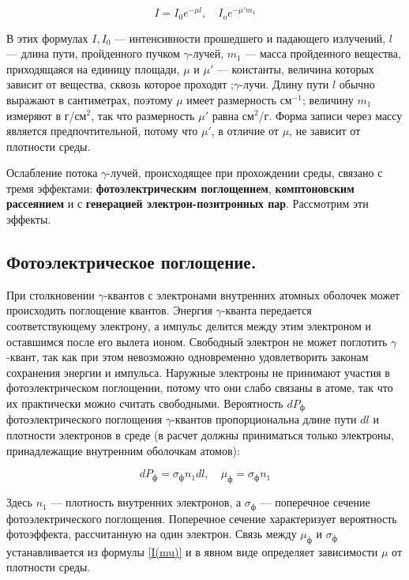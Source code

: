 \documentclass[a4paper,12pt]{extarticle}
\begin{document}
	\begin{equation}\label{I(mu)}
	I = I_0 e^{-\mu l}, \quad I_o e^{-\mu 'm_1} 
	\end{equation}
	
	В этих формулах $ I, I_0 $ --- интенсивности прошедшего и падающего излучений, $ l $ --- длина пути, пройденного пучком $\gamma$-лучей, $ m_1 $ --- масса пройденного вещества, приходящаяся на единицу площади, $ \mu $ и $ \mu' $ --- константы, величина которых зависит от вещества, сквозь которое проходят ;$\gamma$-лучи. Длину пути $ l $ обычно выражают в сантиметрах, поэтому $ \mu $ имеет размерность см$ ^{-1} $; величину $ m_1 $ измеряют в г/см$ ^2 $, так что размерность $ \mu' $ равна см$ ^2 $/г. Форма записи через массу является предпочтительной, потому что $ \mu' $, в отличие от $ \mu $, не зависит от плотности среды. 
	
	Ослабление потока $\gamma$-лучей, происходящее при прохождении среды, связано с тремя эффектами: \textbf{фотоэлектрическим поглощением}, \textbf{комптоновским рассеянием} и с \textbf{генерацией электрон-позитронных пар}. Рассмотрим эти эффекты.
	\subsection*{Фотоэлектрическое поглощение.} При столкновении $\gamma$-квантов с электронами внутренних атомных оболочек может происходить поглощение квантов. Энергия $\gamma$-кванта передается соответствующему электрону, а импульс делится между этим электроном и оставшимся после его вылета ионом. Свободный электрон не может поглотить $\gamma$-квант, так как при этом невозможно одновременно удовлетворить законам сохранения энергии и импульса. Наружные электроны не принимают участия в фотоэлектрическом поглощении, потому что они слабо связаны в атоме, так что их практически можно считать свободными. Вероятность $ dP_{\text{ф}} $ фотоэлектрического поглощения $\gamma$-квантов пропорциональна длине пути $ dl $ и плотности электронов в среде (в расчет должны приниматься только электроны, принадлежащие внутренним оболочкам атомов):
	
	\begin{equation}\label{mu ph}
	dP_{\text{ф}} = \sigma_{\text{ф}} n_1 dl, \quad \mu_{\text{ф}} = \sigma_{\text{ф}} n_1
	\end{equation}
	
	Здесь $ n_1 $ --- плотность внутренних электронов, а $ \sigma_{\text{ф}} $ --- поперечное сечение фотоэлектрического поглощения. Поперечное сечение характеризует вероятность фотоэффекта, рассчитанную на один электрон. Связь между $ \mu_{\text{ф}} $ и $ \sigma_{\text{ф}} $ устанавливается из формулы \eqref{I(mu)} и в явном виде определяет зависимости $ \mu $ от плотности среды.
	
\end{document}
